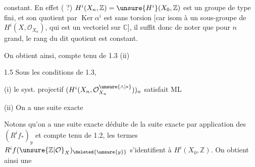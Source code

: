 constant. En effet ( ?) $H^i(X_n,\mathbb Z)=\unsure{H^i}(X_0,\mathbb Z)$ est un groupe de type fini, et son quotient par $\operatorname{Ker}\alpha^i$ est sans torsion [car isom à un sous-groupe de $H^i(X,\mathcal O_{X_n})$, qui est un vectoriel sur $\mathbb C$],  il suffit donc de noter que pour $n$ grand, le rang du dit quotient est constant.

On obtient ainsi, compte tenu de 1.3 (ii) 

\uline{} 1.5 Sous les conditions de 1.3,

(i) le syst. projectif $(H^i(X_n,\mathcal O_{X_n}^{\unsure{\wedge|*}}))_n$ satisfait ML

(ii) On a une suite exacte
\margin{\deleted{\unsure{*}}}

Notons qu'on a une suite exacte déduite de la suite exacte
par application des $(R^if_*)_y$ et compte tenu de 1.2, les  termes $R^if(\unsure{\mathbb Z|\mathcal O}_X)_{\deleted{\unsure{y}}}$  s'identifient à $H^i(X_0,\mathbb Z)$. On obtient ainsi une
